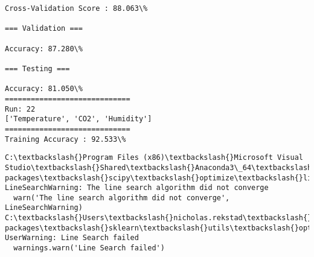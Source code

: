\documentclass[11pt]{article}
\begin{document}
    \begin{Verbatim}[commandchars=\\\{\}]
Cross-Validation Score : 88.063\%

=== Validation ===

Accuracy: 87.280\%

=== Testing ===

Accuracy: 81.050\%
=============================
Run: 22
['Temperature', 'CO2', 'Humidity']
=============================
Training Accuracy : 92.533\%

    \end{Verbatim}

    \begin{Verbatim}[commandchars=\\\{\}]
C:\textbackslash{}Program Files (x86)\textbackslash{}Microsoft Visual Studio\textbackslash{}Shared\textbackslash{}Anaconda3\_64\textbackslash{}lib\textbackslash{}site-packages\textbackslash{}scipy\textbackslash{}optimize\textbackslash{}linesearch.py:313: LineSearchWarning: The line search algorithm did not converge
  warn('The line search algorithm did not converge', LineSearchWarning)
C:\textbackslash{}Users\textbackslash{}nicholas.rekstad\textbackslash{}AppData\textbackslash{}Roaming\textbackslash{}Python\textbackslash{}Python36\textbackslash{}site-packages\textbackslash{}sklearn\textbackslash{}utils\textbackslash{}optimize.py:195: UserWarning: Line Search failed
  warnings.warn('Line Search failed')

    \end{Verbatim}
\end{document}
